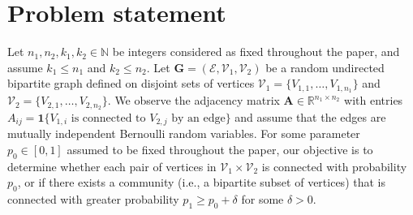 \documentclass{article}
\newcommand{\R}{\mathbb{R}}
\newcommand{\A}{\mathbf{A}}
\newcommand{\bG}{\mathbf{G}}
\newcommand{\cE}{\mathcal{E}}
\newcommand{\cV}{\mathcal{V}}
\newcommand{\one}{\mathbf{1}}
\begin{document}
\section{Problem statement}\label{sec:problem}

Let $n_1, n_2, k_1,k_2 \in \mathbb N$ be integers considered as fixed throughout the paper, and assume $k_1 \leq n_1$ and $k_2 \leq n_2$. 
Let $\bG = (\cE, \cV_1, \cV_2)$ be a random undirected bipartite graph defined on disjoint sets of vertices $\cV_1 = \{ V_{1,1}, \dots, V_{1, n_1}\}$ and $\cV_2 = \{V_{2,1}, \dots, V_{2,n_2}\}$. 
We observe the adjacency matrix $\A \in \R^{n_1 \times n_2}$ with entries $A_{ij} = \one\{\text{$V_{1, i}$ is connected to $V_{2,j}$ by an edge}\}$ and assume that the edges are mutually independent Bernoulli random variables. 
For some parameter $p_0 \in [0,1]$ assumed to be fixed throughout the paper,
our objective is to determine whether each pair of vertices in $\cV_1 \times \cV_2$ is connected with probability $p_0$, or if there exists a  community (i.e., a bipartite subset of vertices) that is connected with greater probability $p_1 \geq p_0 + \delta$ for some $\delta > 0$. 
\end{document}
